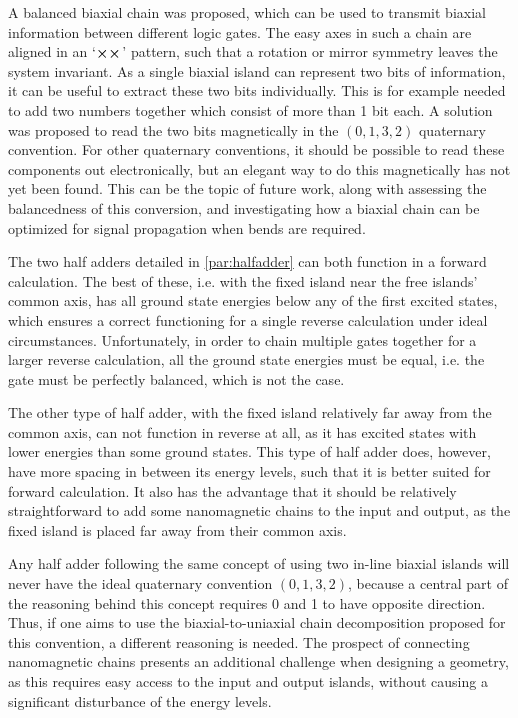 \documentclass[11pt,a4paper,english,twoside]{article}
\begin{document}
A balanced biaxial chain was proposed, which can be used to transmit biaxial information between different logic gates. The easy axes in such a chain are aligned in an `$\cross \cross$' pattern, such that a rotation or mirror symmetry leaves the system invariant. As a single biaxial island can represent two bits of information, it can be useful to extract these two bits individually. This is for example needed to add two numbers together which consist of more than 1 bit each. A solution was proposed to read the two bits magnetically in the $(0,1,3,2)$ quaternary convention. For other quaternary conventions, it should be possible to read these components out electronically, but an elegant way to do this magnetically has not yet been found. This can be the topic of future work, along with assessing the balancedness of this conversion, and investigating how a biaxial chain can be optimized for signal propagation when bends are required. \par
The two half adders detailed in \cref{par:halfadder} can both function in a forward calculation. The best of these, i.e. with the fixed island near the free islands' common axis, has all ground state energies below any of the first excited states, which ensures a correct functioning for a single reverse calculation under ideal circumstances. Unfortunately, in order to chain multiple gates together for a larger reverse calculation, all the ground state energies must be equal, i.e. the gate must be perfectly balanced, which is not the case. \par
The other type of half adder, with the fixed island relatively far away from the common axis, can not function in reverse at all, as it has excited states with lower energies than some ground states. This type of half adder does, however, have more spacing in between its energy levels, such that it is better suited for forward calculation. It also has the advantage that it should be relatively straightforward to add some nanomagnetic chains to the input and output, as the fixed island is placed far away from their common axis. \par
Any half adder following the same concept of using two in-line biaxial islands will never have the ideal quaternary convention $(0,1,3,2)$, because a central part of the reasoning behind this concept requires 0 and 1 to have opposite direction. Thus, if one aims to use the biaxial-to-uniaxial chain decomposition proposed for this convention, a different reasoning is needed. The prospect of connecting nanomagnetic chains presents an additional challenge when designing a geometry, as this requires easy access to the input and output islands, without causing a significant disturbance of the energy levels. \par
\end{document}
